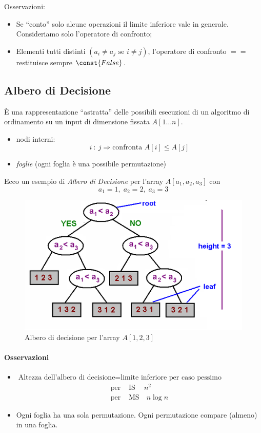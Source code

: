 Osservazioni:
\begin{itemize}[label=$\rightarrow$]
    \item Se ``conto'' solo alcune operazioni il limite inferiore
    vale in generale. Consideriamo solo l'operatore di confronto;
    \item Elementi tutti distinti $(a_i \neq a_j \text{ se } i \neq j)$,
    l'operatore di confronto $==$ restituisce sempre $\const{False}$.
\end{itemize}

\subsection{Albero di Decisione}

È una rappresentazione ``astratta'' delle possibili esecuzioni di un 
algoritmo di ordinamento su un input di dimensione fissata $A[1 \dots n]$.

\begin{itemize}[label=$\rightarrow$]
    \item nodi interni: 
    $$i \ : \ j \Rightarrow \text{confronta } A[i] \leq A[j]$$
    \item \emph{foglie} (ogni foglia è una possibile permutazione)
\end{itemize}

Ecco un esempio di \emph{Albero di Decisione} per l'array $A[a_1,a_2,a_3]$ 
con 
$$a_1 = 1, \; a_2 = 2, \; a_3 = 3$$
\begin{figure}[!hb] 
    \centering
    \includegraphics[width=\textwidth]{img/decision-tree.png}
    \caption{Albero di decisione per l'array $A[1,2,3]$}
\end{figure}

\paragraph{Osservazioni}
\begin{itemize}
	\item $ \text{Altezza dell'albero di decisione} = \text{limite inferiore per caso pessimo}$
	\begin{align*}
	    \text{per }& \text{IS} \ \quad n^2 \\
	    \text{per }& \text{MS} \quad n \log n
	\end{align*}
	\item Ogni foglia ha una sola permutazione. Ogni permutazione compare (almeno) in una foglia.
\end{itemize}

